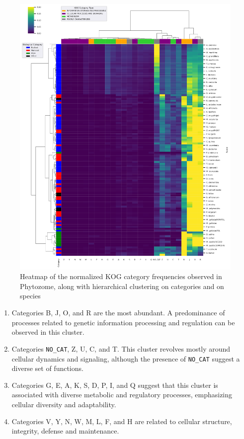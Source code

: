 \begin{figure}[htp]
\centering
\includegraphics[width=\textwidth]{figures/clustermap}
\caption{Heatmap of the normalized KOG category frequencies 
observed in Phytozome, along with hierarchical clustering 
on categories and on species}
\label{fig:clustermap}
\end{figure}

\begin{enumerate}
\item Categories B, J, O, and R are the most abundant. A 
predominance of processes related to genetic information 
processing and regulation can be observed in this cluster.
\item Categories \verb|NO_CAT|, Z, U, C, and T. This 
cluster revolves 
mostly around cellular dynamics and signaling, although the 
presence of \verb|NO_CAT| suggest a diverse set of functions.
\item Categories G, E, A, K, S, D, P, I, and Q suggest that 
this cluster is associated with diverse metabolic and 
regulatory processes, emphasizing cellular diversity and 
adaptability.
\item Categories V, Y, N, W, M, L, F, and H are related to 
cellular structure, integrity, defense and maintenance.
\end{enumerate}



